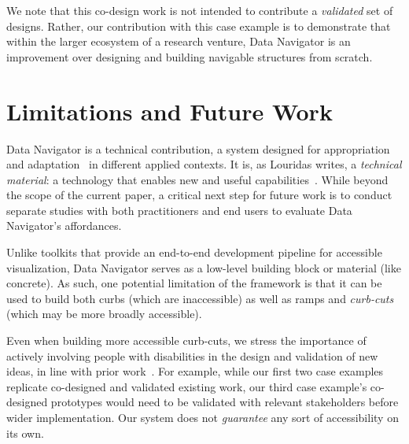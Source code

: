 \documentclass[12pt]{cmuthesis}
\begin{document}

We note that this co-design work is not intended to contribute a \textit{validated} set of designs. Rather, our contribution with this case example is to demonstrate that within the larger ecosystem of a research venture, Data Navigator is an improvement over designing and building navigable structures from scratch.

\section{Limitations and Future Work}
Data Navigator is a technical contribution, a system designed for appropriation~\cite{Dourish2003Appropriation} and adaptation~\cite{Wobbrock2011Ability} in different applied contexts. It is, as Louridas writes, a \textit{technical material}: a technology that enables new and useful capabilities~\cite{Louridas1999Bricolage}. While beyond the scope of the current paper, a critical next step for future work is to conduct separate studies with both practitioners and end users to evaluate Data Navigator's affordances.

Unlike toolkits that provide an end-to-end development pipeline for accessible visualization, Data Navigator serves as a low-level building block or material (like concrete). As such, one potential limitation of the framework is that it can be used to build both curbs (which are inaccessible) as well as ramps and \textit{curb-cuts} (which may be more broadly accessible).

Even when building more accessible curb-cuts, we stress the importance of actively involving people with disabilities in the design and validation of new ideas, in line with prior work~\cite{Reid2022Curb,Lundgard2019Sociotechnical,Lundgard2022Accessible,Zong2022Rich}. For example, while our first two case examples replicate co-designed and validated existing work, our third case example's co-designed prototypes would need to be validated with relevant stakeholders before wider implementation. Our system does not \textit{guarantee} any sort of accessibility on its own.
\end{document}
